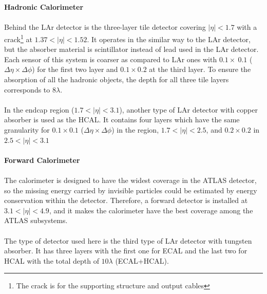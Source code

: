 \\
\\{\bf Hadronic Calorimeter}
\\
\\Behind the LAr detector is the three-layer tile detector covering $|\eta|<1.7$ with a crack\footnote{The crack is for the supporting structure and output cables} at $1.37<|\eta|<1.52$. It operates in the similar way to the LAr detector, but the absorber material is scintillator instead of lead used in the LAr detector. Each sensor of this system is coarser as compared to LAr ones with $0.1 \times ~0.1$ ($\Delta \eta \times \Delta \phi$) for the first two layer and $0.1 \times 0.2$ at the third layer. To ensure the absorption of all the hadronic objects, the depth for all three tile layers corresponds to $8 \lambda$.
\\
\\In the endcap region ($1.7<|\eta|<3.1$), another type of LAr detector with copper absorber is used as the HCAL. It contains four layers which have the same granularity for $0.1 \times 0.1$ ($\Delta \eta \times \Delta \phi$) in the region, $1.7<|\eta|<2.5$, and $0.2 \times 0.2$ in $2.5<|\eta|<3.1$
\\
\\{\bf Forward Calorimeter \cite{Artamonov_2008}}
\\
\\The calorimeter is designed to have the widest coverage in the ATLAS detector, so the missing energy carried by invisible particles could be estimated by energy conservation within the detector. Therefore, a forward detector is installed at $3.1<|\eta|<4.9$, and it makes the calorimeter have the best coverage among the ATLAS subsystems. 
\\
\\The type of detector used here is the third type of LAr detector with tungsten absorber. It has three layers with the first one for ECAL and the last two for HCAL with the total depth of $10\lambda$ (ECAL+HCAL).  

